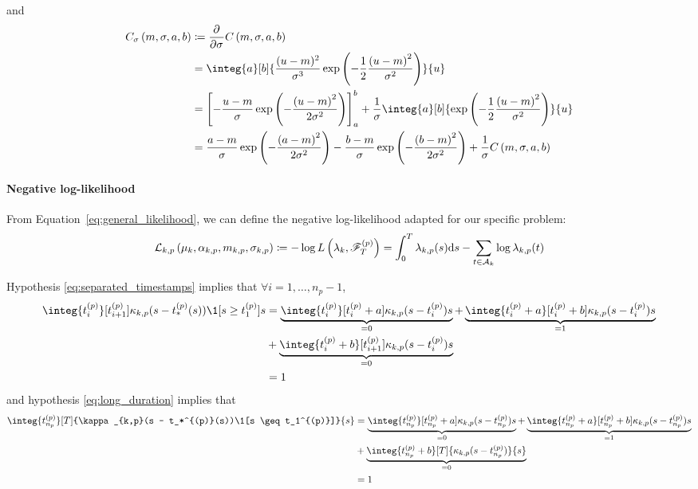and 
\begin{align*}
    C_\sigma\pars{m,\sigma,a,b} &\coloneqq \partiald{}{\sigma} C\pars{m,\sigma,a,b} \\
    &= \integ{a}[b]{\frac{(u-m)^2}{\sigma^3}\e{-\frac{1}{2}\frac{\pars{u-m}^2}{\sigma^2}}}{u} \\
    &= \bracks{-\frac{u-m}{\sigma}\e{-\frac{\pars{u-m}^2}{2\sigma^2}}}_{a}^b + \frac{1}{\sigma} \integ{a}[b]{\e{-\frac{1}{2}\frac{\pars{u-m}^2}{\sigma^2}}}{u} \\
    &= \frac{a-m}{\sigma}\e{-\frac{\pars{a-m}^2}{2\sigma^2}} - \frac{b-m}{\sigma}\e{-\frac{\pars{b-m}^2}{2\sigma^2}} + \frac{1}{\sigma}C\pars{m,\sigma,a,b}
\end{align*}

\paragraph{Negative log-likelihood}
From Equation~\eqref{eq:general_likelihood}, we can define the negative log-likelihood adapted for our specific problem:
\begin{equation}
    \mathcal{L}_{k,p}\left( \mu_k, \alpha_{k,p}, m_{k,p}, \sigma_{k,p} \right) \coloneqq -\log L\left(\lambda_k, \mathscr{F}_{T}^{(p)}\right) = \int_{0}^{T} \lambda_{k,p}(s) \mathrm{d} s-\sum_{t\in\mathcal{A}_k} \log \lambda_{k,p}(t)
\end{equation}

Hypothesis \eqref{eq:separated_timestamps} implies that $\forall i=1,\dots,n_p - 1$,
\begin{align*}
    \integ{t_i^{(p)}}[t_{i+1}^{(p)}]{\kappa_{k,p}(s - t_*^{(p)}(s))\1[s \geq t_1^{(p)}]}{s} &= \underbrace{\integ{t_i^{(p)}}[t_i^{(p)}+a]{\kappa_{k,p}(s - t_i^{(p)})}{s}}_{=0} + \underbrace{\integ{t_i^{(p)}+a}[t_i^{(p)}+b]{\kappa_{k,p}(s - t_i^{(p)})}{s}}_{=1} \\
    &+ \underbrace{\integ{t_i^{(p)}+b}[t_{i+1}^{(p)}]{\kappa_{k,p}(s - t_i^{(p)})}{s}}_{=0} \\
    &= 1
\end{align*}
and hypothesis \eqref{eq:long_duration} implies that
\begin{align*}
    \integ{t_{n_p}^{(p)}}[T]{\kappa_{k,p}(s - t_*^{(p)}(s))\1[s \geq t_1^{(p)}]}{s} &= \underbrace{\integ{t_{n_p}^{(p)}}[t_{n_p}^{(p)} + a]{\kappa_{k,p}(s - t_{n_p}^{(p)})}{s}}_{=0} + \underbrace{\integ{t_{n_p}^{(p)}+a}[t_{n_p}^{(p)} + b]{\kappa_{k,p}(s - t_{n_p}^{(p)})}{s}}_{=1} \\
    &+ \underbrace{\integ{t_{n_p}^{(p)}+b}[T]{\kappa_{k,p}(s - t_{n_p}^{(p)})}{s}}_{=0}\\
    &= 1
\end{align*}

